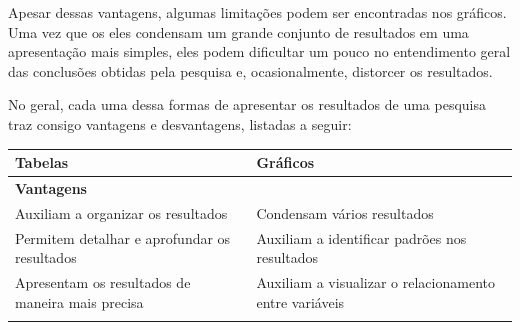 \documentclass[
]{book}
\begin{document}
Apesar dessas vantagens, algumas limitações podem ser encontradas nos gráficos. Uma vez que os eles condensam um grande conjunto de resultados em uma apresentação mais simples, eles podem dificultar um pouco no entendimento geral das conclusões obtidas pela pesquisa e, ocasionalmente, distorcer os resultados.

No geral, cada uma dessa formas de apresentar os resultados de uma pesquisa traz consigo vantagens e desvantagens, listadas a seguir:

\begin{longtable}[]{@{}ll@{}}
\toprule
\begin{minipage}[b]{0.47\columnwidth}\raggedright
Tabelas\strut
\end{minipage} & \begin{minipage}[b]{0.47\columnwidth}\raggedright
Gráficos\strut
\end{minipage}\tabularnewline
\midrule
\endhead
\begin{minipage}[t]{0.47\columnwidth}\raggedright
\textbf{Vantagens}\strut
\end{minipage} & \begin{minipage}[t]{0.47\columnwidth}\raggedright
\strut
\end{minipage}\tabularnewline
\begin{minipage}[t]{0.47\columnwidth}\raggedright
Auxiliam a organizar os resultados\strut
\end{minipage} & \begin{minipage}[t]{0.47\columnwidth}\raggedright
Condensam vários resultados\strut
\end{minipage}\tabularnewline
\begin{minipage}[t]{0.47\columnwidth}\raggedright
Permitem detalhar e aprofundar os resultados\strut
\end{minipage} & \begin{minipage}[t]{0.47\columnwidth}\raggedright
Auxiliam a identificar padrões nos resultados\strut
\end{minipage}\tabularnewline
\begin{minipage}[t]{0.47\columnwidth}\raggedright
Apresentam os resultados de maneira mais precisa\strut
\end{minipage} & \begin{minipage}[t]{0.47\columnwidth}\raggedright
Auxiliam a visualizar o relacionamento entre variáveis\strut
\end{minipage}\tabularnewline
\begin{minipage}[t]{0.47\columnwidth}\raggedright

\end{minipage}
\end{longtable}
\end{document}
